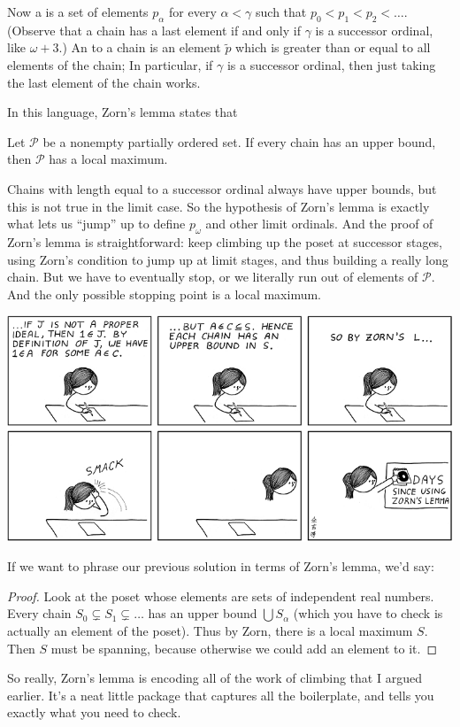Now a  is a set of elements $p_\alpha$ for every $\alpha < \gamma$
such that $p_0 < p_1 < p_2 < \dots$.
(Observe that a chain has a last element if and only if $\gamma$ is a successor ordinal, like $\omega+3$.)
An  to a chain is an element $\tilde p$ which is greater than or equal
to all elements of the chain;
In particular, if $\gamma$ is a successor ordinal, then just taking the last element of the chain works.

In this language, Zorn's lemma states that
\begin{theorem}
	Let $\mathcal P$ be a nonempty partially ordered set.
	If every chain has an upper bound,
	then $\mathcal P$ has a local maximum.
\end{theorem}

Chains with length equal to a successor ordinal always have upper bounds,
but this is not true in the limit case.
So the hypothesis of Zorn's lemma is exactly what
lets us ``jump'' up to define $p_\omega$ and other limit ordinals.
And the proof of Zorn's lemma is straightforward: keep climbing up the poset at successor stages,
using Zorn's condition to jump up at limit stages, and thus building a really long chain.
But we have to eventually stop, or we literally run out of elements of $\mathcal P$.
And the only possible stopping point is a local maximum.

\begin{center}
	\includegraphics[scale=0.5]{media/zornaholic.png}
\end{center}

If we want to phrase our previous solution in terms of Zorn's lemma, we'd say:
\begin{proof}
	Look at the poset whose elements are sets of independent real numbers.
	Every chain $S_0 \subsetneq S_1 \subsetneq \dots$ has an upper bound $\bigcup S_\alpha$
	(which you have to check is actually an element of the poset).
	Thus by Zorn, there is a local maximum $S$.
	Then $S$ must be spanning, because otherwise we could add an element to it.
\end{proof}
So really, Zorn's lemma is encoding all of the work of climbing that I argued earlier.
It's a neat little package that captures all the boilerplate, and tells
you exactly what you need to check.

